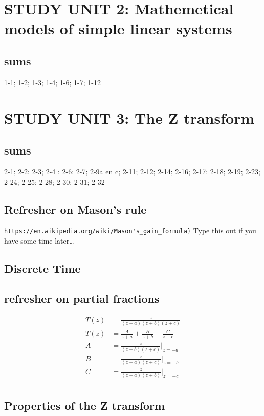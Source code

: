 \documentclass{article}
\begin{document}
\section{STUDY UNIT 2: Mathemetical models of simple linear systems}
\subsection{sums} %
1-1; 1-2; 1-3; 1-4; 1-6; 1-7; 1-12
\section{STUDY UNIT 3: The Z transform}
\subsection{sums} %
2-1; 2-2; 2-3; 2-4 ; 2-6; 2-7; 2-9a en c; 2-11; 2-12; 2-14; 2-16; 2-17; 2-18; 2-19; 2-23; 2-24; 2-25; 2-28; 2-30; 2-31; 2-32
\subsection{Refresher on Mason's rule}

\verb|https://en.wikipedia.org/wiki/Mason's_gain_formula}|
Type this out if you have some time later\dots
\subsection{Discrete Time} %
\label{sub:discrete_time}

\subsection{refresher on partial fractions}
\begin{align*}
	T(z) &=  \frac{z}{(z+a)(z+b)(z+c)}\\
	T(z) &= \frac{A}{z+a} + \frac{B}{z+b} + \frac{C}{z+c}\\
	A &=  \frac{z}{(z+b)(z+c)} \bigg\rvert_{z=-a}\\
	B &=  \frac{z}{(z+a)(z+c)} \bigg\rvert_{z=-b}\\
	C &=  \frac{z}{(z+a)(z+b)} \bigg\rvert_{z=-c}\\
\end{align*}
\subsection{Properties of the Z transform}
\label{sub:Properties of the Z transform}
\end{document}
